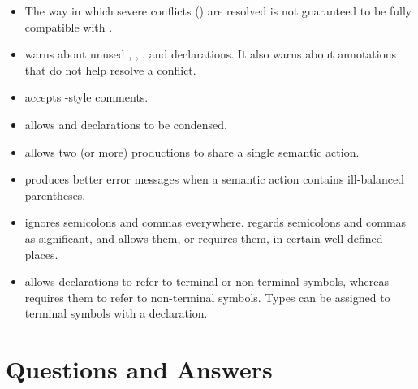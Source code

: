 \documentclass[onecolumn,11pt,nocopyrightspace,preprint]{sigplanconf}
\begin{document}
\begin{itemize}
\item The way in which severe conflicts () are resolved
      is not guaranteed to be fully compatible with \ocamlyacc.

\item \menhir warns about unused \dtoken, \dnonassoc, \dleft, and \dright
      declarations. It also warns about \dprec annotations that do not
      help resolve a conflict.

\item \menhir accepts \ocaml-style comments.

\item \menhir allows \dstart and \dtype declarations to be condensed.

\item \menhir allows two (or more) productions to share a single semantic action.

\item \menhir produces better error messages when a semantic action
      contains ill-balanced parentheses.


\item \ocamlyacc ignores semicolons and commas everywhere. \menhir regards
      semicolons and commas as significant, and allows them, or requires them,
      in certain well-defined places.


\item \ocamlyacc allows \dtype declarations to refer to terminal or non-terminal
      symbols, whereas \menhir requires them to refer to non-terminal symbols.
      Types can be assigned to terminal symbols with a \dtoken declaration.

\end{itemize}


\section{Questions and Answers}
\label{sec:qa}
\end{document}
